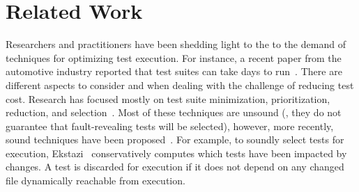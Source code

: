 \section{Related Work}
\label{sec:related}
Researchers and practitioners have been shedding light to the to the
demand of techniques for optimizing test execution. For instance, a
recent paper from the automotive industry reported that test suites
can take days to run~\cite{artl-etal-icst2015}.  There are different
aspects to consider and when dealing with the challenge of reducing
test cost. 
Research has focused mostly on test suite minimization,
prioritization, reduction, and selection~\cite{yoo-harman-stvr2012}.
Most of these techniques are unsound (\ie{}, they do not guarantee
that fault-revealing tests will be selected), however, more recently,
sound techniques have been
proposed~\cite{gligoric-etal-issta2015,soetens-etal-2016}.  For
example, to soundly select tests for execution,
Ekstazi~\cite{ekstazi-web,gligoric-etal-issta2015} conservatively
computes which tests have been impacted by changes.  A test is
discarded for execution if it does not depend on any changed file
dynamically reachable from execution. 
